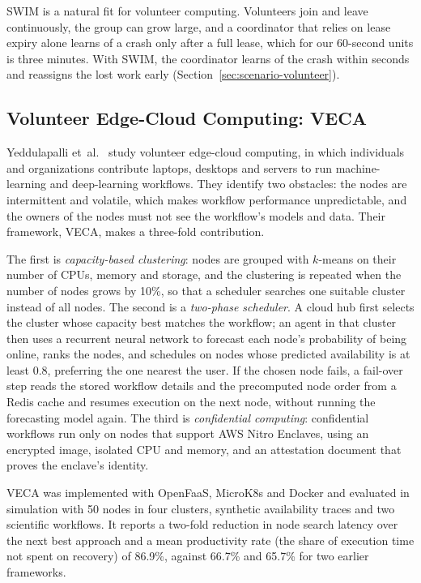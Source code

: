 SWIM is a natural fit for volunteer computing. Volunteers join and leave continuously, the group can grow large, and a coordinator that relies on lease expiry alone learns of a crash only after a full lease, which for our 60-second units is three minutes. With SWIM, the coordinator learns of the crash within seconds and reassigns the lost work early (Section~\ref{sec:scenario-volunteer}).

\subsection{Volunteer Edge-Cloud Computing: VECA}
Yeddulapalli et~al.~\cite{yeddulapalli2024veca} study volunteer edge-cloud computing, in which individuals and organizations contribute laptops, desktops and servers to run machine-learning and deep-learning workflows. They identify two obstacles: the nodes are intermittent and volatile, which makes workflow performance unpredictable, and the owners of the nodes must not see the workflow's models and data. Their framework, VECA, makes a three-fold contribution.

The first is \emph{capacity-based clustering}: nodes are grouped with $k$-means on their number of CPUs, memory and storage, and the clustering is repeated when the number of nodes grows by 10\%, so that a scheduler searches one suitable cluster instead of all nodes. The second is a \emph{two-phase scheduler}. A cloud hub first selects the cluster whose capacity best matches the workflow; an agent in that cluster then uses a recurrent neural network to forecast each node's probability of being online, ranks the nodes, and schedules on nodes whose predicted availability is at least 0.8, preferring the one nearest the user. If the chosen node fails, a fail-over step reads the stored workflow details and the precomputed node order from a Redis cache and resumes execution on the next node, without running the forecasting model again. The third is \emph{confidential computing}: confidential workflows run only on nodes that support AWS Nitro Enclaves, using an encrypted image, isolated CPU and memory, and an attestation document that proves the enclave's identity.

VECA was implemented with OpenFaaS, MicroK8s and Docker and evaluated in simulation with 50 nodes in four clusters, synthetic availability traces and two scientific workflows. It reports a two-fold reduction in node search latency over the next best approach and a mean productivity rate (the share of execution time not spent on recovery) of 86.9\%, against 66.7\% and 65.7\% for two earlier frameworks.

